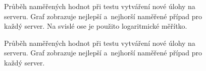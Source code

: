             \begin{figure}[h!t]
             \begin{adjustwidth}{-0.5cm}{}
                \begin{center}
                    \caption{Průběh naměřených hodnot při testu vytváření nové úlohy na serveru.
                        Graf zobrazuje nejlepší a~nejhorší naměřené případ pro každý server.  
                        Na svislé ose je použito logaritmické měřítko.}
                    \label{imgCreateFreestyleCely}
                \end{center}
             \end{adjustwidth}
            \end{figure}

            \begin{figure}[h!t]
             \begin{adjustwidth}{-0.5cm}{}
                \begin{center}
                    \caption{Průběh naměřených hodnot při testu vytváření nové úlohy na serveru.
                        Graf zobrazuje nejlepší a~nejhorší naměřené případ pro každý server.}
                    \label{imgCreateFreestyleCast}
                \end{center}
             \end{adjustwidth}
            \end{figure}

